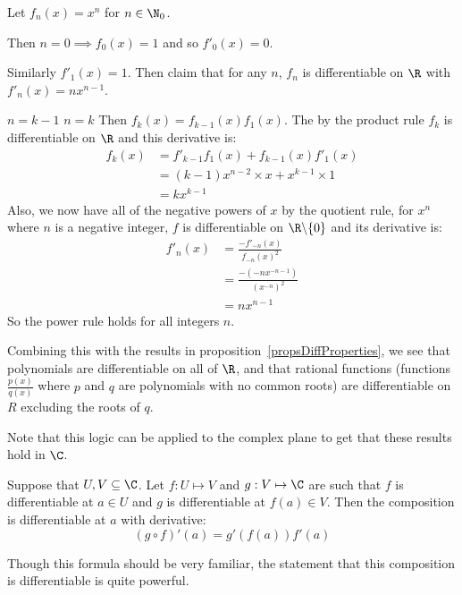 \documentclass[../Main.tex]{subfiles}
\begin{document}
\begin{example}
    Let $f_n(x) = x^n$ for $n \in \N_0$.\par
    Then $n = 0 \implies f_0(x) = 1$ and so $f'_0(x) = 0$.\par
    Similarly $f'_1(x) = 1$. Then claim that for any $n$, $f_n$ is differentiable on $\R$ with $f'_n(x) = nx^{n-1}$.\par
    {$n = k-1$}{}
    {$n = k$}{
        Then $f_k(x) = f_{k-1}(x) f_1(x)$. The by the product rule $f_k$ is differentiable on $\R$ and this derivative is:
        \begin{align*}
            f_k(x) &= f'_{k-1} f_1(x) + f_{k-1}(x) f'_1(x) \\
            &= (k-1)x^{n-2} \times x + x^{k-1} \times 1 \\
            &= kx^{k-1}
        \end{align*}
    }
    Also, we now have all of the negative powers of $x$ by the quotient rule, for $x^n$ where $n$ is a negative integer, $f$ is differentiable on $\R \backslash \{0\}$ and its derivative is:
    \begin{align*}
        f'_n(x) &= \frac{-f'_{-n}(x)}{f_{-n}(x)^2} \\
        &= \frac{-(-nx^{-n-1})}{\left(x^{-n}\right)^2} \\
        &= nx^{n-1}
    \end{align*}
    So the power rule holds for all integers $n$.
\end{example}
Combining this with the results in proposition~\ref{propsDiffProperties}, we see that polynomials are differentiable on all of $\R$, and that rational functions (functions $\frac{p(x)}{q(x)}$ where $p$ and $q$ are polynomials with no common roots) are differentiable on $R$ excluding the roots of $q$.\par
Note that this logic can be applied to the complex plane to get that these results hold in $\C$.
\begin{theorem}
    Suppose that $U, V \subseteq \C$. Let $f : U \mapsto V$ and $g : V \mapsto \C$ are such that $f$ is differentiable at $a \in U$ and $g$ is differentiable at $f(a) \in V$. Then the composition is differentiable at $a$ with derivative:
    \begin{equation}
        (g \circ f)'(a) = g'(f(a)) f'(a)
        \label{eqnChainRule}
    \end{equation}
    \label{thmChainRule}
\end{theorem}
\begin{remark}
    Though this formula should be very familiar, the statement that this composition is differentiable is quite powerful.
\end{remark}
\end{document}
